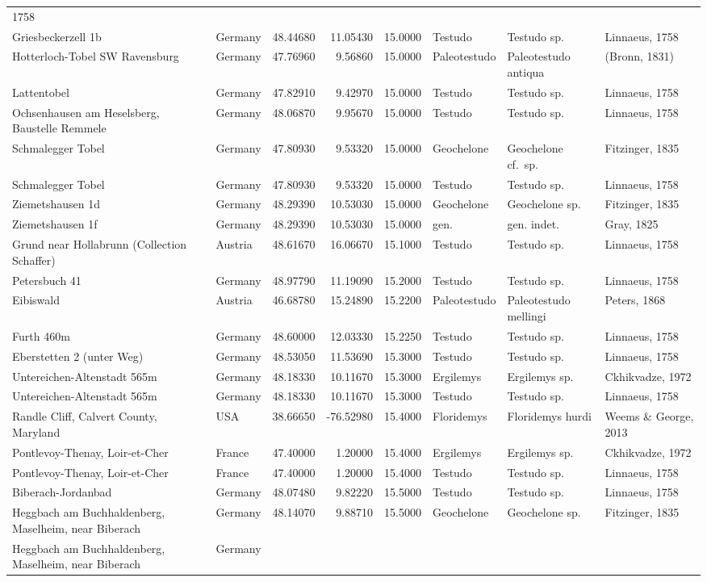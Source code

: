 \documentclass[]{article}
\begin{document}
\begin{longtable}[]{@{}llrrrlll@{}}
1758\tabularnewline
Griesbeckerzell 1b & Germany & 48.44680 & 11.05430 & 15.0000 & Testudo &
Testudo sp. & Linnaeus, 1758\tabularnewline
Hotterloch-Tobel SW Ravensburg & Germany & 47.76960 & 9.56860 & 15.0000
& Paleotestudo & Paleotestudo antiqua & (Bronn, 1831)\tabularnewline
Lattentobel & Germany & 47.82910 & 9.42970 & 15.0000 & Testudo & Testudo
sp. & Linnaeus, 1758\tabularnewline
Ochsenhausen am Heselsberg, Baustelle Remmele & Germany & 48.06870 &
9.95670 & 15.0000 & Testudo & Testudo sp. & Linnaeus,
1758\tabularnewline
Schmalegger Tobel & Germany & 47.80930 & 9.53320 & 15.0000 & Geochelone
& Geochelone cf.~sp. & Fitzinger, 1835\tabularnewline
Schmalegger Tobel & Germany & 47.80930 & 9.53320 & 15.0000 & Testudo &
Testudo sp. & Linnaeus, 1758\tabularnewline
Ziemetshausen 1d & Germany & 48.29390 & 10.53030 & 15.0000 & Geochelone
& Geochelone sp. & Fitzinger, 1835\tabularnewline
Ziemetshausen 1f & Germany & 48.29390 & 10.53030 & 15.0000 & gen. & gen.
indet. & Gray, 1825\tabularnewline
Grund near Hollabrunn (Collection Schaffer) & Austria & 48.61670 &
16.06670 & 15.1000 & Testudo & Testudo sp. & Linnaeus,
1758\tabularnewline
Petersbuch 41 & Germany & 48.97790 & 11.19090 & 15.2000 & Testudo &
Testudo sp. & Linnaeus, 1758\tabularnewline
Eibiswald & Austria & 46.68780 & 15.24890 & 15.2200 & Paleotestudo &
Paleotestudo mellingi & Peters, 1868\tabularnewline
Furth 460m & Germany & 48.60000 & 12.03330 & 15.2250 & Testudo & Testudo
sp. & Linnaeus, 1758\tabularnewline
Eberstetten 2 (unter Weg) & Germany & 48.53050 & 11.53690 & 15.3000 &
Testudo & Testudo sp. & Linnaeus, 1758\tabularnewline
Untereichen-Altenstadt 565m & Germany & 48.18330 & 10.11670 & 15.3000 &
Ergilemys & Ergilemys sp. & Ckhikvadze, 1972\tabularnewline
Untereichen-Altenstadt 565m & Germany & 48.18330 & 10.11670 & 15.3000 &
Testudo & Testudo sp. & Linnaeus, 1758\tabularnewline
Randle Cliff, Calvert County, Maryland & USA & 38.66650 & -76.52980 &
15.4000 & Floridemys & Floridemys hurdi & Weems \& George,
2013\tabularnewline
Pontlevoy-Thenay, Loir-et-Cher & France & 47.40000 & 1.20000 & 15.4000 &
Ergilemys & Ergilemys sp. & Ckhikvadze, 1972\tabularnewline
Pontlevoy-Thenay, Loir-et-Cher & France & 47.40000 & 1.20000 & 15.4000 &
Testudo & Testudo sp. & Linnaeus, 1758\tabularnewline
Biberach-Jordanbad & Germany & 48.07480 & 9.82220 & 15.5000 & Testudo &
Testudo sp. & Linnaeus, 1758\tabularnewline
Heggbach am Buchhaldenberg, Maselheim, near Biberach & Germany &
48.14070 & 9.88710 & 15.5000 & Geochelone & Geochelone sp. & Fitzinger,
1835\tabularnewline
Heggbach am Buchhaldenberg, Maselheim, near Biberach & Germany &

\end{longtable}
\end{document}
